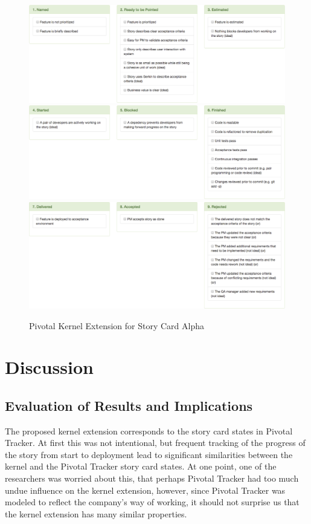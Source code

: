 \documentclass[preprint,12pt,3p]{elsarticle}
\begin{document}
\begin{figure}[ht]
\includegraphics[width=6.25in]{pivotal_images/story_card1}
\includegraphics[width=6.25in]{pivotal_images/story_card2}
\includegraphics[width=6.25in]{pivotal_images/story_card3}
\caption{Pivotal Kernel Extension for Story Card Alpha}
\label{KernelExtension}
\end{figure}

\section{Discussion}

\subsection{Evaluation of Results and Implications}

The proposed kernel extension corresponds to the story card states in Pivotal Tracker. At first this was not intentional, but frequent tracking of the progress of the story from start to deployment lead to significant similarities between the kernel and the Pivotal Tracker story card states. At one point, one of the researchers was worried about this, that perhaps Pivotal Tracker had too much undue influence on the kernel extension, however, since Pivotal Tracker was modeled to reflect the company's way of working, it should not surprise us that the kernel extension has many similar properties. 
\end{document}
